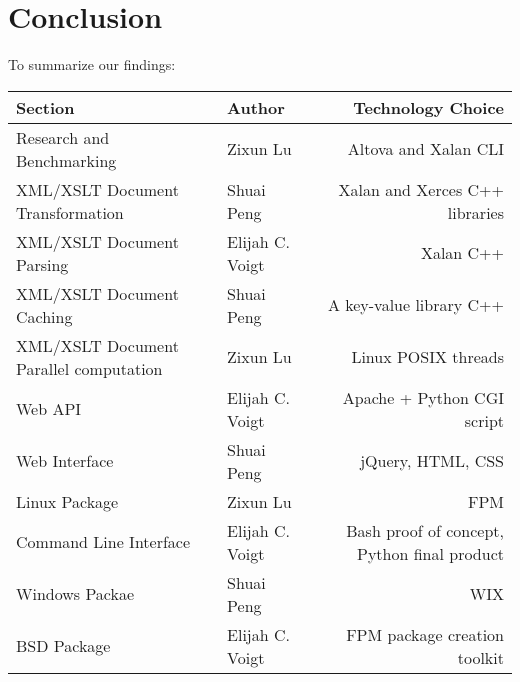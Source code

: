 \section{Conclusion}

To summarize our findings:

\begin{center}
    \begin{tabular}{ | l | p{5cm} | r | }
    \hline
    Section & Author & Technology Choice\\ \hline
    Research and Benchmarking & Zixun Lu & Altova and Xalan CLI \\ \hline
    XML/XSLT Document Transformation & Shuai Peng & Xalan and Xerces C++ libraries \\ \hline
    XML/XSLT Document Parsing & Elijah C. Voigt & Xalan C++ \\ \hline
    XML/XSLT Document Caching & Shuai Peng & A key-value library C++ \\ \hline
    XML/XSLT Document Parallel computation & Zixun Lu & Linux POSIX threads \\ \hline
    Web API & Elijah C. Voigt & Apache + Python CGI script \\ \hline
    Web Interface & Shuai Peng & jQuery, HTML, CSS \\ \hline
    Linux Package & Zixun Lu & FPM \\ \hline
    Command Line Interface& Elijah C. Voigt & Bash proof of concept, Python final product \\ \hline
    Windows Packae & Shuai Peng & WIX \\ \hline
    BSD Package & Elijah C. Voigt & FPM package creation toolkit \\ \hline
    \end{tabular}
\end{center}

\clearpage
